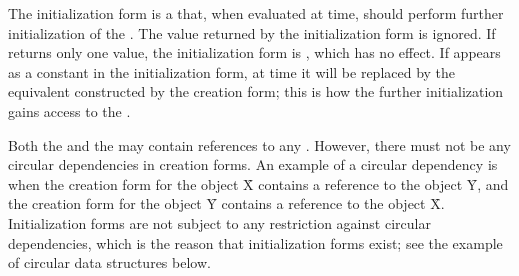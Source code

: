 The initialization form is a  that, when evaluated at  time, 
should perform further initialization of the .  
The value returned by the initialization form is ignored.
If 
returns only one value, 
the initialization form is \nil, which has no effect.
If  appears as a constant in the initialization form,
at  time it will be replaced by the equivalent  
constructed by the creation form;
this is how the further initialization gains access to the .
 
Both the  and the  may contain references
to any .
However, there must not be any circular dependencies in creation forms.
An example of a circular dependency is when the creation form for the
object \f{X} contains a reference to the object \f{Y},
and the creation form for the object \f{Y} contains a reference to the object \f{X}.  
Initialization forms are not subject to any restriction against circular dependencies, 
which is the reason that initialization forms exist; 
see the example of circular data structures below.
 

